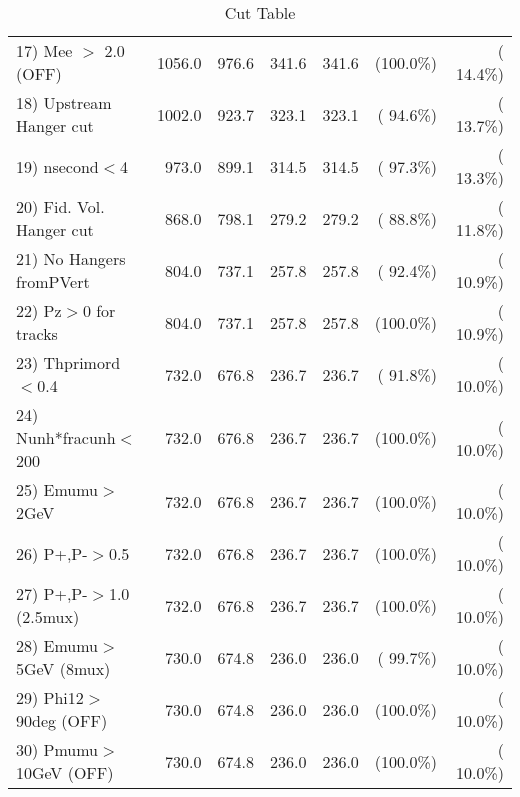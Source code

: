 \begin{table}[h!]
\begin{tabular}{||l||r|r|r|r|r|r||}
 17) Mee $>$ 2.0  (OFF)   &       1056.0 &        976.6 &        341.6 &        341.6 & (100.0\%) & ( 14.4\%) \\
 18) Upstream Hanger cut  &       1002.0 &        923.7 &        323.1 &        323.1 & ( 94.6\%) & ( 13.7\%) \\
 19) nsecond$<$4          &        973.0 &        899.1 &        314.5 &        314.5 & ( 97.3\%) & ( 13.3\%) \\
 20) Fid. Vol. Hanger cut &        868.0 &        798.1 &        279.2 &        279.2 & ( 88.8\%) & ( 11.8\%) \\
 21) No Hangers fromPVert &        804.0 &        737.1 &        257.8 &        257.8 & ( 92.4\%) & ( 10.9\%) \\
 22) Pz$>$0 for tracks    &        804.0 &        737.1 &        257.8 &        257.8 & (100.0\%) & ( 10.9\%) \\
 23) Thprimord$<$0.4      &        732.0 &        676.8 &        236.7 &        236.7 & ( 91.8\%) & ( 10.0\%) \\
 24) Nunh*fracunh$<$200   &        732.0 &        676.8 &        236.7 &        236.7 & (100.0\%) & ( 10.0\%) \\
 25) Emumu$>$2GeV         &        732.0 &        676.8 &        236.7 &        236.7 & (100.0\%) & ( 10.0\%) \\
 26) P+,P-$>$0.5          &        732.0 &        676.8 &        236.7 &        236.7 & (100.0\%) & ( 10.0\%) \\
 27) P+,P-$>$1.0 (2.5mux) &        732.0 &        676.8 &        236.7 &        236.7 & (100.0\%) & ( 10.0\%) \\
 28) Emumu$>$5GeV  (8mux) &        730.0 &        674.8 &        236.0 &        236.0 & ( 99.7\%) & ( 10.0\%) \\
 29) Phi12$>$90deg  (OFF) &        730.0 &        674.8 &        236.0 &        236.0 & (100.0\%) & ( 10.0\%) \\
 30) Pmumu$>$10GeV  (OFF) &        730.0 &        674.8 &        236.0 &        236.0 & (100.0\%) & ( 10.0\%) \\
 \hline
 \hline
 \end{tabular}
 \caption{Cut Table           }
 \label{tab-cutcohjpsi-mumu_ccdis}
 \end{table}
